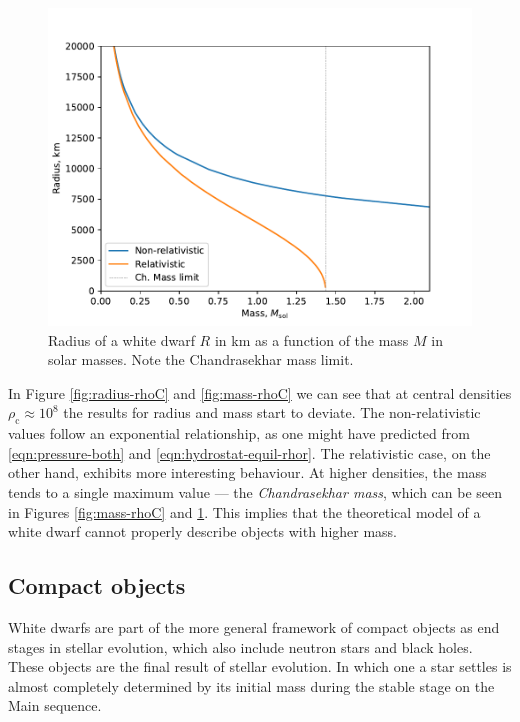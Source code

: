 \documentclass[]{article}
\newcommand{\rhoCentre}{\rho_\mathrm{c}}
\begin{document}
	\begin{figure}[!htb]
		\centering
		\includegraphics[height=0.3\textheight]{figures/radius-mass.pdf}
		\caption{Radius of a white dwarf $R$ in km as a function of the mass $M$ in solar masses. Note the Chandrasekhar mass limit.\label{fig:radius-mass}}
	\end{figure}
	 
	In Figure \ref{fig:radius-rhoC} and \ref{fig:mass-rhoC} we can see that at central densities $ \rhoCentre \approx 10^8$ the results for radius and mass start to deviate. The non-relativistic values follow an exponential relationship, as one might have predicted from \eqref{eqn:pressure-both} and \eqref{eqn:hydrostat-equil-rhor}. The relativistic case, on the other hand, exhibits more interesting behaviour. At higher densities, the mass tends to a single maximum value --- the \emph{Chandrasekhar mass}, which can be seen in Figures \ref{fig:mass-rhoC} and \ref{fig:radius-mass}. This implies that the theoretical model of a white dwarf cannot properly describe objects with higher mass.

	\subsection{Compact objects}
	White dwarfs are part of the more general framework of compact objects as end stages in stellar evolution, which also include neutron stars and black holes. These objects are the final result of stellar evolution. In which one a star settles is almost completely determined by its initial mass during the stable stage on the Main sequence. 
	
\end{document}

